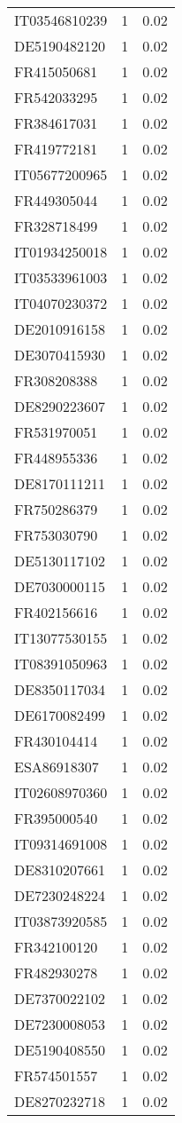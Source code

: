 \begin{table*}[htbp]
\begin{tabular}{lrr}
IT03546810239 & 1 & 0.02 \\
DE5190482120 & 1 & 0.02 \\
FR415050681 & 1 & 0.02 \\
FR542033295 & 1 & 0.02 \\
FR384617031 & 1 & 0.02 \\
FR419772181 & 1 & 0.02 \\
IT05677200965 & 1 & 0.02 \\
FR449305044 & 1 & 0.02 \\
FR328718499 & 1 & 0.02 \\
IT01934250018 & 1 & 0.02 \\
IT03533961003 & 1 & 0.02 \\
IT04070230372 & 1 & 0.02 \\
DE2010916158 & 1 & 0.02 \\
DE3070415930 & 1 & 0.02 \\
FR308208388 & 1 & 0.02 \\
DE8290223607 & 1 & 0.02 \\
FR531970051 & 1 & 0.02 \\
FR448955336 & 1 & 0.02 \\
DE8170111211 & 1 & 0.02 \\
FR750286379 & 1 & 0.02 \\
FR753030790 & 1 & 0.02 \\
DE5130117102 & 1 & 0.02 \\
DE7030000115 & 1 & 0.02 \\
FR402156616 & 1 & 0.02 \\
IT13077530155 & 1 & 0.02 \\
IT08391050963 & 1 & 0.02 \\
DE8350117034 & 1 & 0.02 \\
DE6170082499 & 1 & 0.02 \\
FR430104414 & 1 & 0.02 \\
ESA86918307 & 1 & 0.02 \\
IT02608970360 & 1 & 0.02 \\
FR395000540 & 1 & 0.02 \\
IT09314691008 & 1 & 0.02 \\
DE8310207661 & 1 & 0.02 \\
DE7230248224 & 1 & 0.02 \\
IT03873920585 & 1 & 0.02 \\
FR342100120 & 1 & 0.02 \\
FR482930278 & 1 & 0.02 \\
DE7370022102 & 1 & 0.02 \\
DE7230008053 & 1 & 0.02 \\
DE5190408550 & 1 & 0.02 \\
FR574501557 & 1 & 0.02 \\
DE8270232718 & 1 & 0.02 \\
\bottomrule
\end{tabular}
\end{table*}
